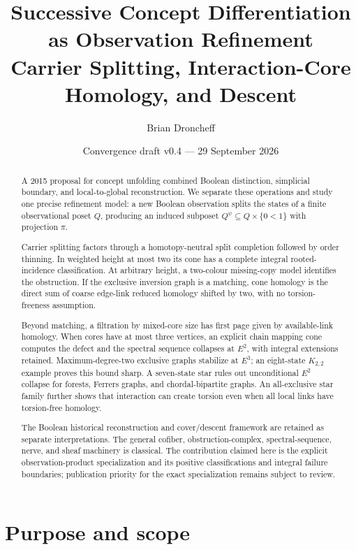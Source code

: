 \documentclass[11pt]{article}
\title{\textbf{Successive Concept Differentiation as Observation Refinement}\\
\large Carrier Splitting, Interaction-Core Homology, and Descent}
\author{Brian Droncheff}
\date{Convergence draft v0.4 --- 29 September 2026}
\begin{document}
\maketitle

\begin{abstract}
A 2015 proposal for concept unfolding combined Boolean distinction, simplicial
boundary, and local-to-global reconstruction.  We separate these operations
and study one precise refinement model: a new Boolean observation splits the
states of a finite observational poset $Q$, producing an induced subposet
$Q^\psi\subseteq Q\times\{0<1\}$ with projection $\pi$.

Carrier splitting factors through a homotopy-neutral split completion followed
by order thinning.  In weighted height at most two its cone has a complete
integral rooted-incidence classification.  At arbitrary height, a two-colour
missing-copy model identifies the obstruction.  If the exclusive inversion
graph is a matching, cone homology is the direct sum of coarse edge-link
reduced homology shifted by two, with no torsion-freeness assumption.

Beyond matching, a filtration by mixed-core size has first page given by
available-link homology.  When cores have at most three vertices, an explicit
chain mapping cone computes the defect and the spectral sequence collapses at
$E^2$, with integral extensions retained.  Maximum-degree-two exclusive graphs
stabilize at $E^3$; an eight-state $K_{2,2}$ example proves this bound sharp.
A seven-state star rules out unconditional $E^2$ collapse for forests, Ferrers
graphs, and chordal-bipartite graphs.  An all-exclusive star family further
shows that interaction can create torsion even when all local links have
torsion-free homology.

The Boolean historical reconstruction and cover/descent framework are retained
as separate interpretations.  The general cofiber, obstruction-complex,
spectral-sequence, nerve, and sheaf machinery is classical.  The contribution
claimed here is the explicit observation-product specialization and its
positive classifications and integral failure boundaries; publication priority
for the exact specialization remains subject to review.

\end{abstract}

\tableofcontents

\section{Purpose and scope}
\end{document}
